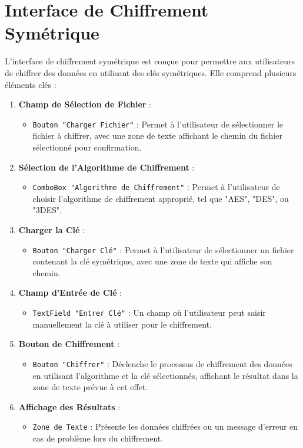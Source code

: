 \documentclass[a4paper,12pt]{report}
\begin{document}
   \clearpage
	
\section{Interface de Chiffrement Symétrique}

L'interface de chiffrement symétrique est conçue pour permettre aux utilisateurs de chiffrer des données en utilisant des clés symétriques. Elle comprend plusieurs éléments clés :

\begin{enumerate}

	
	\item \textbf{Champ de Sélection de Fichier} : 
	\begin{itemize}
		\item \texttt{Bouton "Charger Fichier"} : Permet à l'utilisateur de sélectionner le fichier à chiffrer, avec une zone de texte affichant le chemin du fichier sélectionné pour confirmation.
	\end{itemize}
	
	\item \textbf{Sélection de l'Algorithme de Chiffrement} : 
	\begin{itemize}
		\item \texttt{ComboBox "Algorithme de Chiffrement"} : Permet à l'utilisateur de choisir l'algorithme de chiffrement approprié, tel que "AES", "DES", ou "3DES".
	\end{itemize}
	
	\item \textbf{Charger la Clé} : 
	\begin{itemize}
		\item \texttt{Bouton "Charger Clé"} : Permet à l'utilisateur de sélectionner un fichier contenant la clé symétrique, avec une zone de texte qui affiche son chemin.
	\end{itemize}
	
	\item \textbf{Champ d'Entrée de Clé} : 
	\begin{itemize}
		\item \texttt{TextField "Entrer Clé"} : Un champ où l'utilisateur peut saisir manuellement la clé à utiliser pour le chiffrement.
	\end{itemize}
	
	\item \textbf{Bouton de Chiffrement} : 
	\begin{itemize}
		\item \texttt{Bouton "Chiffrer"} : Déclenche le processus de chiffrement des données en utilisant l'algorithme et la clé sélectionnés, affichant le résultat dans la zone de texte prévue à cet effet.
	\end{itemize}
	
	\item \textbf{Affichage des Résultats} : 
	\begin{itemize}
		\item \texttt{Zone de Texte} : Présente les données chiffrées ou un message d'erreur en cas de problème lors du chiffrement.
	\end{itemize}
\end{enumerate}
\end{document}
